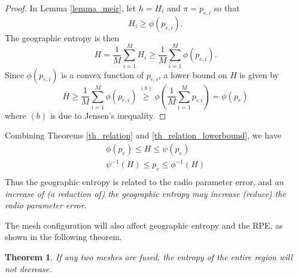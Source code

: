 \documentclass[conference]{IEEEtran}
\newtheorem{Theo}{Theorem}
\begin{document}
\begin{proof}
In Lemma \ref{lemma_meir}, let $h = H_i$ and $\pi = p_{e,i}$ so that
\begin{equation}
{H_i} \ge \phi ({p_{e,i}}).
\end{equation}
The geographic entropy is then
\begin{equation}
H = \frac{1}{M}\sum\limits_{i = 1}^M {{H_i}}  \ge \frac{1}{M}\sum\limits_{i = 1}^M {\phi ({p_{e,i}})}.
\end{equation}
Since $\phi (p_{e,i} )$ is a convex function of $p_{e,i}$, a lower bound on $H$ is given by
\begin{equation}
H \ge \frac{1}{M}\sum\limits_{i = 1}^M {{\phi }({p_{e,i}})} \mathop  \ge \limits^{(b)} {\phi }(\frac{1}{M}\sum\limits_{i = 1}^M {{p_{e.i}}} ) = {\phi }({p_e})
\end{equation}
where $(b)$ is due to Jensen's inequality.
\end{proof}
Combining Theorems \ref{th_relation} and \ref{th_relation_lowerbound}, we have
\begin{equation}
\begin{array}{*{20}{c}}
   {\phi \left( {{p_e}} \right) \le H \le \psi \left( {{p_e}} \right)}  \\
   {{\psi ^{ - 1}}\left( {{H}} \right) \le {p_e} \le {\phi ^{ - 1}}\left( {{H}} \right)}  \\
\end{array}
\end{equation}
Thus the geographic entropy is related to the radio parameter error,
and \emph{an increase of (a reduction of) the geographic entropy may increase (reduce) the radio parameter error}.

The mesh configuration will also affect geographic entropy and the RPE, as shown in the following theorem.
\begin{Theo}
If any two meshes are fused, the entropy of the entire region will not decrease.
\end{Theo}
\end{document}

